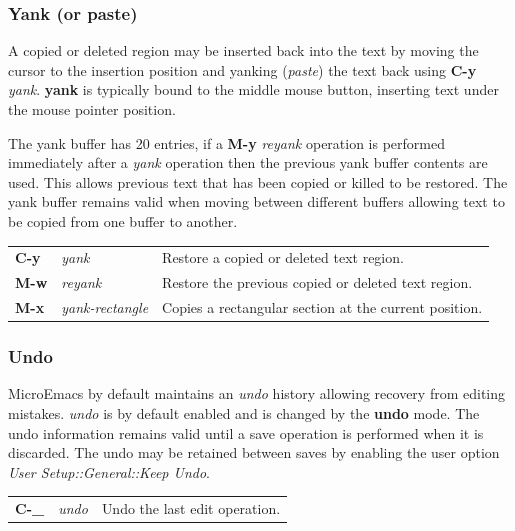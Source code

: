 \documentclass[11pt,a4paper,pdftex]{article}
\begin{document}
\subsubsection{Yank (or paste)}

  A copied or deleted region may be inserted back into the text by moving the
  cursor to the insertion position and yanking (\textit{paste}) the text back
  using \textbf{C-y} \textit{yank}. \textbf{yank} is typically bound to the
  middle mouse button, inserting text under the mouse pointer position.

  The yank buffer has 20 entries, if a \textbf{M-y} \textit{reyank} operation
  is performed immediately after a \textit{yank} operation then the previous
  yank buffer contents are used. This allows previous text that has been
  copied or killed to be restored. The yank buffer remains valid when moving
  between different buffers allowing text to be copied from one buffer to
  another.

  \begin{longtable}{ll@{\ --\ }l}
    \endhead
    \endfoot
    \endlastfoot
    \textbf{C-y} & \textit{yank} &
    Restore a copied or deleted text region.\\
    \textbf{M-w} & \textit{reyank} &
    Restore the previous copied or deleted text region.\\
    \textbf{M-x} & \textit{yank-rectangle} &
    Copies a rectangular section at the current position. \\
  \end{longtable}

\subsubsection{Undo}

  MicroEmacs by default maintains an \textit{undo} history allowing recovery
  from editing mistakes. \textit{undo} is by default enabled and is changed by
  the \textbf{undo} mode. The undo information remains valid until a save
  operation is performed when it is discarded. The undo may be retained
  between saves by enabling the user option \textit{User
  Setup::\-General::\-Keep Undo}.

  \begin{longtable}{ll@{\ --\ }l}
    \endhead
    \endfoot
    \endlastfoot
    \textbf{C-\_} & \textit{undo} &
    Undo the last edit operation.\\
  \end{longtable}
\end{document}
